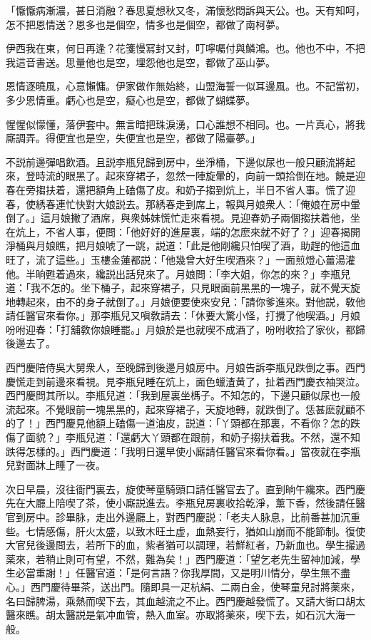 \begin{myquote}
「懨懨病漸濃，甚日消融？春思夏想秋又冬，滿懷愁悶訴與天公。也。天有知呵，怎不把恩情送？恩多也是個空，情多也是個空，都做了南柯夢。

伊西我在東，何日再逢？花箋慢冩封又封，叮嚀囑付與鱗鴻。也。他也不中，不把我這音書送。思量他也是空，埋怨他也是空，都做了巫山夢。

恩情逐曉風，心意懶慵。伊家做作無始終，山盟海誓一似耳邊風。也。不記當初，多少恩情重。虧心也是空，癡心也是空，都做了蝴蝶夢。

惺惺似懞懂，落伊套中。無言暗把珠淚湧，口心誰想不相同。也。一片真心，將我廝調弄。得便宜也是空，失便宜也是空，都做了陽臺夢。」
\end{myquote}

不説前邊彈唱飲酒。且説李瓶兒歸到房中，坐淨桶，下邊似尿也一般只顧流將起來，登時流的眼黑了。起來穿裙子，忽然一陣旋暈的，向前一頭拾倒在地。饒是迎春在旁搊扶着，還把額角上磕傷了皮。和奶子搊到炕上，半日不省人事。慌了迎春，使綉春連忙快對大娘説去。那綉春走到席上，報與月娘衆人：「俺娘在房中暈倒了。」這月娘撇了酒席，與衆姊妹慌忙走來看視。見迎春奶子兩個搊扶着他，坐在炕上，不省人事，便問：「他好好的進屋裏，端的怎麽來就不好了？」迎春揭開淨桶與月娘瞧，把月娘唬了一跳，説道：「此是他剛纔只怕喫了酒，助趕的他這血旺了，流了這些。」玉樓金蓮都説：「他幾曾大好生喫酒來？」一面煎燈心薑湯灌他。半晌甦着過來，纔説出話兒來了。月娘問：「李大姐，你怎的來？」李瓶兒道：「我不怎的。坐下桶子，起來穿裙子，只見眼面前黑黑的一塊子，就不覺天旋地轉起來，由不的身子就倒了。」月娘便要使來安兒：「請你爹進來。對他説，敎他請任醫官來看你。」那李瓶兒又嗔敎請去：「休要大驚小怪，打攪了他喫酒。」月娘吩咐迎春：「打舖敎你娘睡罷。」月娘於是也就喫不成酒了，吩咐收拾了家伙，都歸後邊去了。

西門慶陪侍吳大舅衆人，至晚歸到後邊月娘房中。月娘告訴李瓶兒跌倒之事。西門慶慌走到前邊來看視。見李瓶兒睡在炕上，面色蠟渣黄了，扯着西門慶衣袖哭泣。西門慶問其所以。李瓶兒道：「我到屋裏坐榪子。不知怎的，下邊只顧似尿也一般流起來。不覺眼前一塊黑黑的，起來穿裙子，天旋地轉，就跌倒了。恁甚麽就顧不的了！」西門慶見他額上磕傷一道油皮，説道：「丫頭都在那裏，不看你？怎的跌傷了面貌？」李瓶兒道：「還虧大丫頭都在跟前，和奶子搊扶着我。不然，還不知跌得怎樣的。」西門慶道：「我明日還早使小廝請任醫官來看你看。」當夜就在李瓶兒對面牀上睡了一夜。

次日早晨，沒往衙門裏去，旋使琴童騎頭口請任醫官去了。直到晌午纔來。西門慶先在大廳上陪喫了茶，使小廝説進去。李瓶兒房裏收拾乾淨，薰下香，然後請任醫官到房中。診畢脉，走出外邊廳上，對西門慶説：「老夫人脉息，比前番甚加沉重些。七情感傷，肝火太盛，以致木旺土虚，血熱妄行，猶如山崩而不能節制。復使大官兒後邊問去，若所下的血，紫者猶可以調理，若鮮紅者，乃新血也。學生撮過薬來，若稍止則可有望，不然，難為矣！」西門慶道：「望乞老先生留神加減，學生必當重謝！」任醫官道：「是何言語？你我厚間，又是明川情分，學生無不盡心。」西門慶待畢茶，送出門。隨即具一疋杭絹、二兩白金，使琴童兒討將薬來，名曰歸脾湯，乘熱而喫下去，其血越流之不止。西門慶越發慌了。又請大街口胡太醫來瞧。胡太醫説是氣冲血管，熱入血室。亦取將薬來，喫下去，如石沉大海一般。

